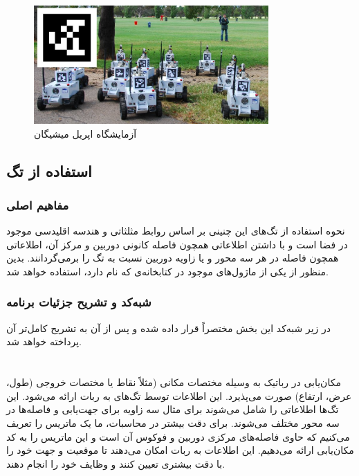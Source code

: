 \begin{figure}[h]
	\centering
	\includegraphics[width=0.8\textwidth]{./images/Chapter2/AprilTagLab}	
	\caption[آزمایشگاه اپریل میشیگان]{ آزمایشگاه اپریل میشیگان\cite{Apriltag}}
	\label{AprilTagLab}
\end{figure}
\noindent
\unskip

\subsection{استفاده از تگ}
\subsubsection{مفاهیم اصلی}
نحوه استفاده از تگ‌های این چنینی بر اساس روابط مثلثاتی و هندسه اقلیدسی موجود در فضا است و با داشتن اطلاعاتی همچون فاصله کانونی دوربین و مرکز آن، اطلاعاتی همچون فاصله در هر سه محور و یا زاویه دوربین نسبت به تگ را برمی‌گردانند.
بدین منظور از یکی از ماژول‌های موجود در کتابخانه‌ی
که
نام دارد، استفاده خواهد شد. 
\subsubsection{شبه‌کد و تشریح جزئیات برنامه}

در زیر شبه‌کد این بخش مختصراً قرار داده شده و پس از آن به تشریح کامل‌تر آن پرداخته خواهد شد.
\section*{}
\begin{latin}
	
\end{latin}

مکان‌یابی در رباتیک به وسیله مختصات مکانی (مثلاً نقاط
یا مختصات خروجی (طول، عرض، ارتفاع) صورت می‌پذیرد. این اطلاعات توسط تگ‌های
به ربات ارائه می‌شود. این تگ‌ها اطلاعاتی را شامل می‌شوند برای مثال سه زاویه
برای جهت‌یابی و فاصله‌ها در سه محور مختلف می‌شوند. برای دقت بیشتر در محاسبات، ما یک ماتریس را تعریف می‌کنیم که حاوی فاصله‌های مرکزی دوربین و فوکوس آن است و این ماتریس را به کد مکان‌یابی ارائه می‌دهیم. این اطلاعات به ربات امکان می‌دهند تا موقعیت و جهت خود را با دقت بیشتری تعیین کنند و وظایف خود را انجام دهند.
